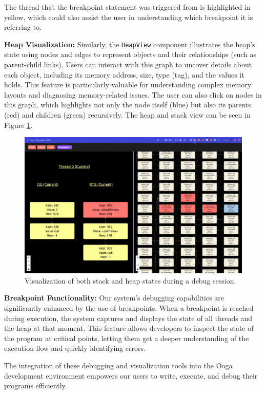 \documentclass{report}
\begin{document}
The thread that the breakpoint statement was triggered from is highlighted in yellow, which could also assist the user in understanding which breakpoint it is referring to.

\textbf{Heap Visualization:}
Similarly, the \texttt{HeapView} component illustrates the heap's state using nodes and edges to represent objects and their relationships (such as parent-child links). Users can interact with this graph to uncover details about each object, including its memory address, size, type (tag), and the values it holds. This feature is particularly valuable for understanding complex memory layouts and diagnosing memory-related issues. The user can also click on nodes in this graph, which highlights not only the node itself (blue) but also its parents (red) and children (green) recursively. The heap and stack view can be seen in Figure \ref{fig:stack-heap-view}.

\begin{figure}
    \centering
    \includegraphics[width=1\linewidth]{images/stackheapview.png}
    \caption{Visualization of both stack and heap states during a debug session.}
    \label{fig:stack-heap-view}
\end{figure}

\textbf{Breakpoint Functionality:}
Our system’s debugging capabilities are significantly enhanced by the use of breakpoints. When a breakpoint is reached during execution, the system captures and displays the state of all threads and the heap at that moment. This feature allows developers to inspect the state of the program at critical points, letting them get a deeper understanding of the execution flow and quickly identifying errors.

The integration of these debugging and visualization tools into the Ooga development environment empowers our users to write, execute, and debug their programs efficiently. 
\end{document}
